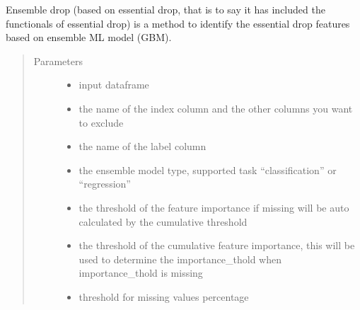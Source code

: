 \documentclass[letterpaper,11pt,english]{sphinxmanual}
\begin{document}
\begin{fulllineitems}
\begin{fulllineitems}
\label{\detokenize{auto_feature:AutoFeatures.AutoFeatures.ensemble_drop}}
Ensemble drop (based on essential drop, that is to say it has included the functionals of essential drop) is a
method to identify the essential drop features based on ensemble ML model (GBM).
\begin{quote}\begin{description}
\item[{Parameters}] \leavevmode\begin{itemize}
\item {} 
 \textendash{} input dataframe

\item {} 
 \textendash{} the name of the index column and the other columns you want to exclude

\item {} 
 \textendash{} the name of the label column

\item {} 
 \textendash{} the ensemble model type, supported task “classification” or “regression”

\item {} 
 \textendash{} the threshold of the feature importance if missing will be auto calculated by the
cumulative threshold

\item {} 
 \textendash{} the threshold of the cumulative feature importance, this will be used to determine
the importance\_thold when importance\_thold is missing

\item {} 
 \textendash{} threshold for missing values percentage


\end{itemize}
\end{description}
\end{quote}
\end{fulllineitems}
\end{fulllineitems}
\end{document}
